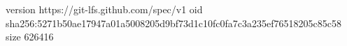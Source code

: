 version https://git-lfs.github.com/spec/v1
oid sha256:5271b50ae17947a01a5008205d9bf73d1c10fc0fa7c3a235ef76518205c85c58
size 626416
